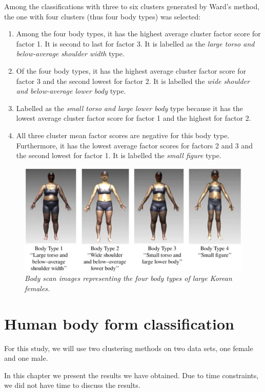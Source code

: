 \documentclass[12pt,a4paper,openany,UKenglish]{scrreprt}
\begin{document}
Among the classifications with three to six clusters generated by Ward's method, the one with four clusters (thus four body types) was selected:
\begin{enumerate}[label=\textbf{Type \arabic*:}, nolistsep]
	\item Among the four body types, it has the highest average cluster factor score for factor 1.
	      It is second to last for factor 3.
	      It is labelled as the \textit{large torso and below-average shoulder width} type.
	\item Of the four body types, it has the highest average cluster factor score for factor 3 and the second lowest for factor 2.
	      It is labelled the \textit{wide shoulder and below-average lower body} type.
	\item Labelled as the \textit{small torso and large lower body} type because it has the lowest average cluster factor score for factor 1 and the highest for factor 2.
	\item All three cluster mean factor scores are negative for this body type.
	      Furthermore, it has the lowest average factor scores for factors 2 and 3 and the second lowest for factor 1.
	      It is labelled the \textit{small figure} type.
\end{enumerate}
\begin{figure}[H]
	\centering
	\caption{\footnotesize\centering\itshape Body scan images representing the four body types of large Korean females.}
	\includegraphics[width=.8\linewidth]{../Images/Park2}
\end{figure}

\chapter{Human body form classification}
For this study, we will use two clustering methods on two data sets, one female and one male.

In this chapter we present the results we have obtained. Due to time constraints, we did not have time to discuss the results.
\end{document}
